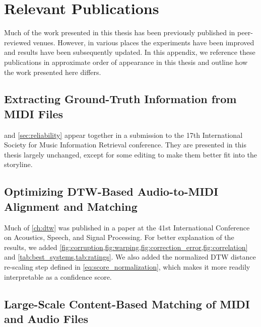 \chapter{Relevant Publications}

Much of the work presented in this thesis has been previously published in peer-reviewed venues.
However, in various places the experiments have been improved and results have been subsequently updated.
In this appendix, we reference these publications in approximate order of appearance in this thesis and outline how the work presented here differs.

\section{Extracting Ground-Truth Information from MIDI Files}

 and \cref{sec:reliability} appear together in a submission to the 17th International Society for Music Information Retrieval conference.
They are presented in this thesis largely unchanged, except for some editing to make them better fit into the storyline.

\section{Optimizing DTW-Based Audio-to-MIDI Alignment and Matching \cite{raffel2016optimizing}}

Much of \cref{ch:dtw} was published in a paper at the 41st International Conference on Acoustics, Speech, and Signal Processing.
For better explanation of the results, we added \cref{fig:corruption,fig:warping,fig:correction_error,fig:correlation} and \cref{tab:best_systems,tab:ratings}.
We also added the normalized DTW distance re-scaling step defined in \cref{eq:score_normalization}, which makes it more readily interpretable as a confidence score.

\section{Large-Scale Content-Based Matching of MIDI and Audio Files \cite{raffel2015large}}

